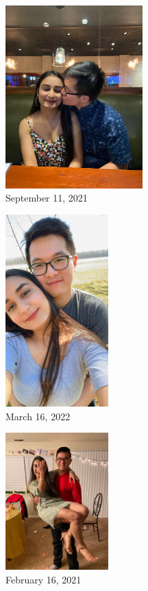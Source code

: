 \documentclass[
]{book}
\begin{document}
\begin{figure}
\centering
\includegraphics[width=2.08333in,height=\textheight]{mimages/13.1 9-11-2021.jpg}
\caption{September 11, 2021}
\end{figure}

\begin{figure}
\centering
\includegraphics[width=1.5625in,height=\textheight]{mimages/17 3-16-2022.jpg}
\caption{March 16, 2022}
\end{figure}

\begin{figure}
\centering
\includegraphics[width=1.5625in,height=\textheight]{mimages/7 2-16-2021.jpg}
\caption{February 16, 2021}
\end{figure}
\end{document}
